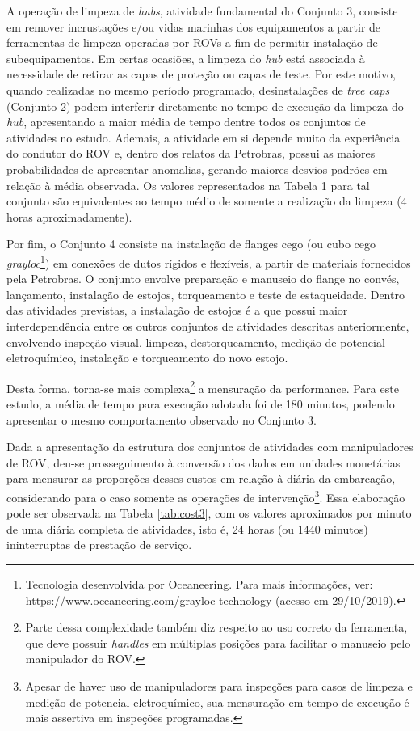A operação de limpeza de \textit{hubs}, atividade fundamental do Conjunto 3, consiste em remover incrustações e/ou vidas marinhas dos equipamentos a partir de ferramentas de limpeza operadas por ROVs a fim de permitir instalação de subequipamentos. Em certas ocasiões, a limpeza do \textit{hub} está associada à necessidade de retirar as capas de proteção ou capas de teste. Por este motivo, quando realizadas no mesmo período programado, desinstalações de \textit{tree caps} (Conjunto 2) podem interferir diretamente no tempo de execução da limpeza do \textit{hub}, apresentando a maior média de tempo dentre todos os conjuntos de atividades no estudo. Ademais, a atividade em si depende muito da experiência do condutor do ROV e, dentro dos relatos da Petrobras, possui as maiores probabilidades de apresentar anomalias, gerando maiores desvios padrões em relação à média observada. Os valores representados na Tabela 1 para tal conjunto são equivalentes ao tempo médio de somente a realização da limpeza (4 horas aproximadamente).  

Por fim, o Conjunto 4 consiste na instalação de flanges cego (ou cubo cego \textit{grayloc}\footnote{Tecnologia desenvolvida por Oceaneering. Para mais informações, ver: https://www.oceaneering.com/grayloc-technology (acesso em 29/10/2019).}) em conexões de dutos rígidos e flexíveis, a partir de materiais fornecidos pela Petrobras. O conjunto envolve preparação e manuseio do flange no convés, lançamento, instalação de estojos, torqueamento e teste de estaqueidade. Dentro das atividades previstas, a instalação de estojos é a que possui maior interdependência entre os outros conjuntos de atividades descritas anteriormente, envolvendo inspeção visual, limpeza, destorqueamento, medição de potencial eletroquímico, instalação e torqueamento do novo estojo. 

Desta forma, torna-se mais complexa\footnote{Parte dessa complexidade também diz respeito ao uso correto da ferramenta, que deve possuir \textit{handles} em múltiplas posições para facilitar o manuseio pelo manipulador do ROV.}  a mensuração da performance. Para este estudo, a média de tempo para execução adotada foi de 180 minutos, podendo apresentar o mesmo comportamento observado no Conjunto 3.  

Dada a apresentação da estrutura dos conjuntos de atividades com manipuladores de ROV, deu-se prosseguimento à conversão dos dados em unidades monetárias para mensurar as proporções desses custos em relação à diária da embarcação, considerando para o caso somente as operações de intervenção\footnote{Apesar de haver uso de manipuladores para inspeções para casos de limpeza e medição de potencial eletroquímico, sua mensuração em tempo de execução é mais assertiva em inspeções programadas.}. Essa elaboração pode ser observada na Tabela \ref{tab:cost3}, com os valores aproximados por minuto de uma diária completa de atividades, isto é, 24 horas (ou 1440 minutos) ininterruptas de prestação de serviço. 

